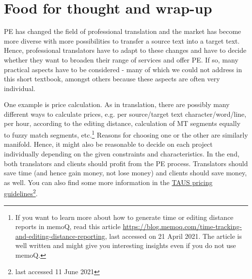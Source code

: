 \chapter{Food for thought and wrap-up}\label{sec:10}

PE has changed the field of professional translation and the market has become more diverse with more possibilities to transfer a source text into a target text. Hence, professional translators have to adapt to these changes and have to decide whether they want to broaden their range of services and offer PE. If so, many practical aspects have to be considered - many of which we could not address in this short textbook, amongst others because these aspects are often very individual. 

One example is price calculation. As in translation, there are possibly many different ways to calculate prices, e.g. per source/target text character/word/line, per hour, according to the editing distance, calculation of MT segments equally to fuzzy match segments, etc.\footnote{If you want to learn more about how to generate time or editing distance reports in memoQ, read this article \url{https://blog.memoq.com/time-tracking-and-editing-distance-reporting}, last accessed on 21 April 2021. The article is well written and might give you interesting insights even if you do not use memoQ.} Reasons for choosing one or the other are similarly manifold. Hence, it might also be reasonable to decide on  each project individually depending on the given constraints and characteristics. In the end, both translators and clients should profit from the PE process. Translators should save time (and hence gain money, not lose money) and clients should save money, as well. You can also find some more information in the \href{https://www.taus.net/academy/best-practices/postedit-best-practices/pricing-machine-translation-post-editing-guidelines}{TAUS pricing guidelines}\footnote{last accessed 11 June 2021}.



